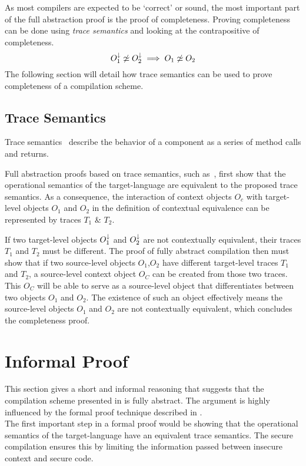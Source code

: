 As most compilers are expected to be `correct' or sound, the most important part of the full abstraction proof is the proof of completeness.
Proving completeness can be done using \emph{trace semantics} and looking at the contrapositive of completeness.
\[
    O_{1}^{\downarrow} \not\simeq O_{2}^{\downarrow} \implies O_{1} \not\simeq O_{2}
\]
The following section will detail how trace semantics can be used to prove completeness of a compilation scheme.

\subsection{Trace Semantics}
\label{sec:tracesemantics}
Trace semantics~\cite{Rathke, Patrignani:TraceSemantics} describe the behavior of a component as a series of method calls and returns.

Full abstraction proofs based on trace semantics, such as~\cite{Patrignani,Agten:2012:SCM:2354412.2355247}, first show that the operational semantics of the target-language are equivalent to the proposed trace semantics.
As a consequence, the interaction of context objects $O_{c}$ with target-level objects $O_{1}$ and $O_{2}$ in the definition of contextual equivalence can be represented by traces $T_{1}$ \& $T_{2}$.

If two target-level objects $O_1^{\downarrow}$ and $O_2^{\downarrow}$ are not contextually equivalent, their traces $T_1$ and $T_2$ must be different.
The proof of fully abstract compilation then must show that if two source-level objects $O_1$,$O_2$ have different target-level traces $T_1$ and $T_2$, a source-level context object $O_C$ can be created from those two traces.
This $O_C$ will be able to serve as a source-level object that differentiates between two objects $O_1$ and $O_2$.
The existence of such an object effectively means the source-level objects $O_1$ and $O_2$ are not contextually equivalent, which concludes the completeness proof.

\section{Informal Proof}
\label{sec:informalproof}

This section gives a short and informal reasoning that suggests that the compilation scheme presented in  is fully abstract.
The argument is highly influenced by the formal proof technique described in .
\\[1em]
The first important step in a formal proof would be showing that the operational semantics of the target-language have an equivalent trace semantics.
The secure compilation ensures this by limiting the information passed between insecure context and secure code.

